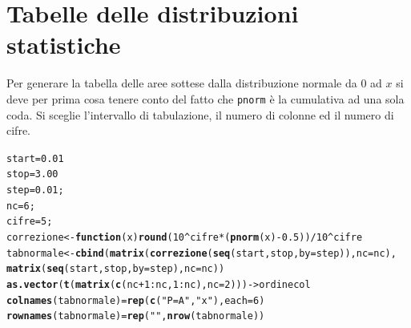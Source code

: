 \documentclass[onecolumn,12pt]{book}\usepackage[]{graphicx}\usepackage[]{color}
\makeatletter
\newcommand{\hlnum}[1]{\textcolor[rgb]{0.686,0.059,0.569}{#1}}%
\newcommand{\hlstr}[1]{\textcolor[rgb]{0.192,0.494,0.8}{#1}}%
\newcommand{\hlopt}[1]{\textcolor[rgb]{0,0,0}{#1}}%
\newcommand{\hlstd}[1]{\textcolor[rgb]{0.345,0.345,0.345}{#1}}%
\newcommand{\hlkwa}[1]{\textcolor[rgb]{0.161,0.373,0.58}{\textbf{#1}}}%
\newcommand{\hlkwb}[1]{\textcolor[rgb]{0.69,0.353,0.396}{#1}}%
\newcommand{\hlkwc}[1]{\textcolor[rgb]{0.333,0.667,0.333}{#1}}%
\newcommand{\hlkwd}[1]{\textcolor[rgb]{0.737,0.353,0.396}{\textbf{#1}}}%
\newenvironment{kframe}{%
 \def\at@end@of@kframe{}%
 \ifinner\ifhmode%
  \def\at@end@of@kframe{\end{minipage}}%
  \begin{minipage}{\columnwidth}%
 \fi\fi%
 \def\FrameCommand##1{\hskip\@totalleftmargin \hskip-\fboxsep
 \colorbox{shadecolor}{##1}\hskip-\fboxsep
     \hskip-\linewidth \hskip-\@totalleftmargin \hskip\columnwidth}%
 \MakeFramed {\advance\hsize-\width
   \@totalleftmargin\z@ \linewidth\hsize
   \@setminipage}}%
 {\par\unskip\endMakeFramed%
 \at@end@of@kframe}
\newenvironment{knitrout}{}{} %
\makeatother
\begin{document}

\section*{Tabelle delle distribuzioni statistiche}
Per generare la tabella delle aree sottese dalla distribuzione normale da 0 ad $x$ si deve per prima cosa tenere conto del fatto che \texttt{pnorm}  \`e la cumulativa ad una sola coda. Si sceglie l'intervallo di tabulazione, il numero di colonne ed il numero di cifre.
\begin{knitrout}
\color{fgcolor}\begin{kframe}
\begin{alltt}
\hlstd{start}\hlkwb{=}\hlnum{0.01}
\hlstd{stop}\hlkwb{=}\hlnum{3.00}
\hlstd{step}\hlkwb{=}\hlnum{0.01}\hlstd{;}
\hlstd{nc}\hlkwb{=}\hlnum{6}\hlstd{;}
\hlstd{cifre}\hlkwb{=}\hlnum{5}\hlstd{;}
\hlstd{correzione}\hlkwb{<-}\hlkwa{function}\hlstd{(}\hlkwc{x}\hlstd{)}  \hlkwd{round}\hlstd{(}\hlnum{10}\hlopt{^}\hlstd{cifre}\hlopt{*} \hlstd{(}\hlkwd{pnorm}\hlstd{(x)}\hlopt{-}\hlnum{0.5}\hlstd{))}\hlopt{/}\hlnum{10}\hlopt{^}\hlstd{cifre}
 \hlstd{tabnormale}\hlkwb{<-}\hlkwd{cbind}\hlstd{(}\hlkwd{matrix}\hlstd{(}\hlkwd{correzione}\hlstd{(}\hlkwd{seq}\hlstd{(start,stop,}\hlkwc{by}\hlstd{=step)),}\hlkwc{nc}\hlstd{=nc),}
 \hlkwd{matrix}\hlstd{(}\hlkwd{seq}\hlstd{(start,stop,}\hlkwc{by}\hlstd{=step),}\hlkwc{nc}\hlstd{=nc))}
\hlkwd{as.vector}\hlstd{(}\hlkwd{t}\hlstd{(}\hlkwd{matrix}\hlstd{(}\hlkwd{c}\hlstd{(nc}\hlopt{+}\hlnum{1}\hlopt{:}\hlstd{nc,}\hlnum{1}\hlopt{:}\hlstd{nc),}\hlkwc{nc}\hlstd{=}\hlnum{2}\hlstd{)))}\hlkwb{->}\hlstd{ordinecol}
\hlkwd{colnames}\hlstd{( tabnormale)}\hlkwb{=} \hlkwd{rep}\hlstd{(}\hlkwd{c}\hlstd{(} \hlstr{"P=A"}\hlstd{,}\hlstr{"x"}\hlstd{),}\hlkwc{each}\hlstd{=}\hlnum{6}\hlstd{)}
\hlkwd{rownames}\hlstd{( tabnormale)}\hlkwb{=}\hlkwd{rep}\hlstd{(}\hlstr{""}\hlstd{,}\hlkwd{nrow}\hlstd{( tabnormale))}
\end{alltt}
\end{kframe}
\end{knitrout}
\end{document}
